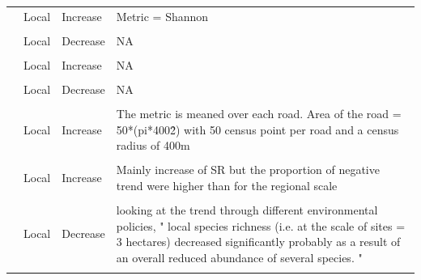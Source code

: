 \documentclass[
  12pt,
  oneside]{report}
\begin{document}
\begin{landscape}
\begin{longtable}[t]{>{\raggedright\arraybackslash}p{6.5em}>{\raggedright\arraybackslash}p{6.5em}>{\raggedright\arraybackslash}p{6.5em}>{\raggedright\arraybackslash}p{40em}}
 & Local & Increase & Metric = Shannon\\
\cellcolor{gray!6}{} & \cellcolor{gray!6}{Local} & \cellcolor{gray!6}{Increase} & \cellcolor{gray!6}{Metric = Simpson}\\
 & Local & Decrease & NA\\
\cellcolor{gray!6}{} & \cellcolor{gray!6}{Local} & \cellcolor{gray!6}{Increase} & \cellcolor{gray!6}{\vphantom{2} NA}\\
\addlinespace
 & Local & Increase & \vphantom{1} NA\\
\cellcolor{gray!6}{} & \cellcolor{gray!6}{Local} & \cellcolor{gray!6}{Increase} & \cellcolor{gray!6}{NA}\\
\cite{sorte_changes_2005} & Local & Decrease & NA\\
\cellcolor{gray!6}{} & \cellcolor{gray!6}{Local} & \cellcolor{gray!6}{Decrease} & \cellcolor{gray!6}{Metric = evenness}\\
 & Local & Increase & The metric is meaned over each road. Area of the road = 50*(pi*400\^2) with 50 census point per road and a census radius of 400m\\
\addlinespace
\cellcolor{gray!6}{\cite{van_turnhout_scale-dependent_2007}} & \cellcolor{gray!6}{Regional} & \cellcolor{gray!6}{Increase} & \cellcolor{gray!6}{For each region, the trend is computed}\\
 & Local & Increase & Mainly increase of SR but the proportion of negative trend were higher than for the regional scale\\
\cellcolor{gray!6}{} & \cellcolor{gray!6}{National} & \cellcolor{gray!6}{Increase} & \cellcolor{gray!6}{National scale}\\
\cite{wretenberg_changes_2010} & Local & Decrease & looking at the trend through different environmental policies, " local species richness (i.e. at the scale of sites = 3 hectares) decreased significantly probably as a result of an overall reduced abundance of several species. "\\*
\end{longtable}
\endgroup{}
\end{landscape}

\singlespacing


\renewcommand\bibname{References}
  
\end{document}
